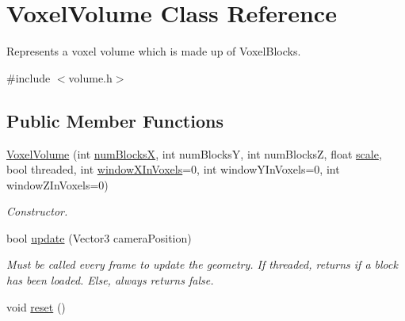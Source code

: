\hypertarget{classVoxelVolume}{
\section{\-Voxel\-Volume \-Class \-Reference}
\label{d0/d1c/classVoxelVolume}
}


\-Represents a voxel volume which is made up of \-Voxel\-Blocks.  




{\ttfamily \#include $<$volume.\-h$>$}

\subsection*{\-Public \-Member \-Functions}
\begin{DoxyCompactItemize}
\item 
\hypertarget{classVoxelVolume_a26b4b0c284e35987038eb0825aca4e96}{
\hyperlink{classVoxelVolume_a26b4b0c284e35987038eb0825aca4e96}{\-Voxel\-Volume} (int \hyperlink{classVoxelVolume_a98c9bdda61574015a5b2e008567f6910}{num\-Blocks\-X}, int num\-Blocks\-Y, int num\-Blocks\-Z, float \hyperlink{classVoxelVolume_a1d986ee8a74dc700d400ed389eea6f6a}{scale}, bool threaded, int \hyperlink{classVoxelVolume_a06763f7a3d2702fbba4b471ae67ce2e1}{window\-X\-In\-Voxels}=0, int window\-Y\-In\-Voxels=0, int window\-Z\-In\-Voxels=0)}
\label{d0/d1c/classVoxelVolume_a26b4b0c284e35987038eb0825aca4e96}

\begin{DoxyCompactList}\small\item\em \-Constructor. \end{DoxyCompactList}\item 
\hypertarget{classVoxelVolume_a32b70f3f162b157c541e9a6a62a50930}{
bool \hyperlink{classVoxelVolume_a32b70f3f162b157c541e9a6a62a50930}{update} (\-Vector3 camera\-Position)}
\label{d0/d1c/classVoxelVolume_a32b70f3f162b157c541e9a6a62a50930}

\begin{DoxyCompactList}\small\item\em \-Must be called every frame to update the geometry. \-If threaded, returns if a block has been loaded. \-Else, always returns false. \end{DoxyCompactList}\item 
\hypertarget{classVoxelVolume_a0eee3f32fc8066a89ebac3a74128902e}{
void \hyperlink{classVoxelVolume_a0eee3f32fc8066a89ebac3a74128902e}{reset} ()}
\label{d0/d1c/classVoxelVolume_a0eee3f32fc8066a89ebac3a74128902e}


\end{DoxyCompactItemize}
